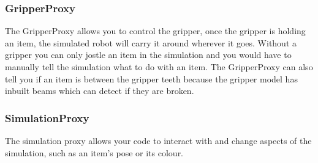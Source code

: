 \documentclass[a4paper]{report}
\begin{document}
\subsubsection{GripperProxy}
The GripperProxy allows you to control the gripper, once the gripper is holding an item, the simulated robot will carry it around wherever it goes. Without a gripper you can only jostle an item in the simulation and you would have to manually tell the simulation what to do with an item. The GripperProxy can also tell you if an item is between the gripper teeth because the gripper model has inbuilt beams which can detect if they are broken. 


\subsubsection{SimulationProxy}
The simulation proxy allows your code to interact with and change aspects of the simulation, such as an item's pose or its colour. 
\end{document}
